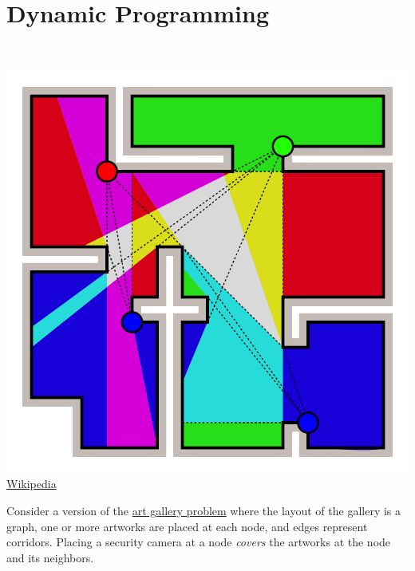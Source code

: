\documentclass[addpoints,a4paper]{exam}
\begin{document}
\begin{questions}
\begin{solution}
  \end{solution}

  \section*{Dynamic Programming}
  \question \ \newline
  \begin{minipage}{0.2\linewidth}
    \centering
    \includegraphics[width=\textwidth,align=t]{gallery}\\
    \href{https://en.wikipedia.org/wiki/Art_gallery_problem}{Wikipedia}
  \end{minipage}
  \hfill
  \begin{minipage}{0.78\linewidth}
    Consider a version of the \href{https://en.wikipedia.org/wiki/Art_gallery_problem}{art gallery problem} where the layout of the gallery is a graph, one or more artworks are placed at each node, and edges represent corridors. Placing a security camera at a node \textit{covers} the artworks at the node and its neighbors.
\end{minipage}
\end{questions}
\end{document}
